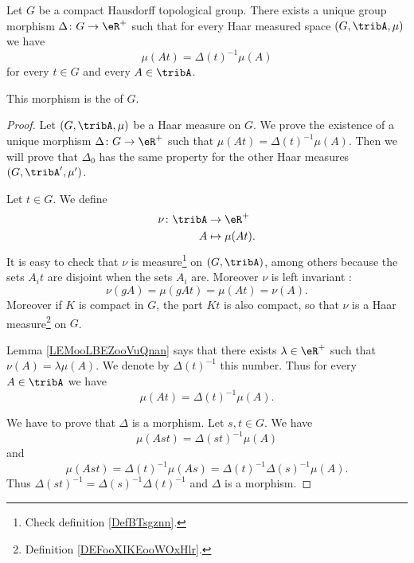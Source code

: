 \begin{theoremDef}       \label{THOooKVLYooBmeMHM}
	Let \( G\) be a compact Hausdorff topological group. There exists a unique group morphism \( \Delta\colon G\to \eR^+\) such that for every Haar measured space \( (G,\tribA, \mu)\) we have
	\begin{equation}
		\mu(At)=\Delta(t)^{-1}\mu(A)
	\end{equation}
	for every \( t\in G\) and every \( A\in\tribA\).

	This morphism is the  of \( G\).
\end{theoremDef}

\begin{proof}
	Let \( (G,\tribA,\mu)\) be a Haar measure on \( G\). We prove the existence of a unique morphism \( \Delta\colon G\to \eR^+\) such that $\mu(At)=\Delta(t)^{-1}\mu(A)$. Then we will prove that \( \Delta_0\) has the same property for the other Haar measures \( (G,\tribA',\mu')\).

	Let \( t\in G\). We define
	\begin{equation}
		\begin{aligned}
			\nu\colon \tribA & \to \eR^+        \\
			A                & \mapsto \mu(At).
		\end{aligned}
	\end{equation}
	It is easy to check that \( \nu\) is measure\footnote{Check definition \ref{DefBTsgznn}.} on \( (G,\tribA)\), among others because the sets \( A_it\) are disjoint when the sets \( A_i\) are. Moreover \( \nu\) is left invariant :
	\begin{equation}
		\nu(gA)=\mu(gAt)=\mu(At)=\nu(A).
	\end{equation}
	Moreover if \( K\) is compact in \( G\), the part \( Kt\) is also compact, so that \( \nu\) is a Haar measure\footnote{Definition \ref{DEFooXIKEooWOxHlr}.} on \( G\).

	Lemma \ref{LEMooLBEZooVuQnan} says that there exists \( \lambda\in \eR^+\) such that \( \nu(A)=\lambda \mu(A)\). We denote by \( \Delta(t)^{-1}\) this number. Thus for every \( A\in \tribA\) we have
	\begin{equation}
		\mu(At)=\Delta(t)^{-1}\mu(A).
	\end{equation}

	We have to prove that \( \Delta\) is a morphism. Let \( s,t\in G\). We have
	\begin{equation}
		\mu(Ast)=\Delta(st)^{-1}\mu(A)
	\end{equation}
	and
	\begin{equation}
		\mu(Ast)=\Delta(t)^{-1}\mu(As)=\Delta(t)^{-1}\Delta(s)^{-1}\mu(A).
	\end{equation}
	Thus \( \Delta(st)^{-1}=\Delta(s)^{-1}\Delta(t)^{-1}\) and \( \Delta\) is a morphism.


\end{proof}

